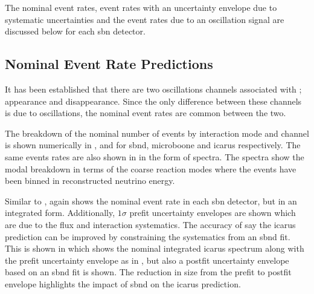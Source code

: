 The nominal event rates, event rates with an uncertainty envelope due to systematic uncertainties and the event rates due to an oscillation signal are discussed below for each \gls{sbn} detector. 


\subsection{Nominal Event Rate Predictions}

It has been established that there are two oscillations channels associated with \nue; \nue appearance and \nue disappearance. Since the only difference between these channels is due to oscillations, the nominal event rates are common between the two.

The breakdown of the nominal number of events by interaction mode and channel is shown numerically in ,  and  for \gls{sbnd}, \gls{microboone} and \gls{icarus} respectively. The same events rates are also shown in  in the form of spectra. The spectra show the modal breakdown in terms of the coarse reaction modes where the events have been binned in reconstructed neutrino energy. 

Similar to ,  again shows the nominal event rate in each \gls{sbn} detector, but in an integrated form. Additionally, $1\sigma$ prefit uncertainty envelopes are shown which are due to the flux and interaction systematics. The accuracy of say the \gls{icarus} prediction can be improved by constraining the systematics from an \gls{sbnd} fit. This is shown in  which shows the nominal integrated \gls{icarus} spectrum along with the prefit uncertainty envelope as in , but also a postfit uncertainty envelope based on an \gls{sbnd} fit is shown. The reduction in size from the prefit to postfit envelope highlights the impact of \gls{sbnd} on the \gls{icarus} prediction. 

